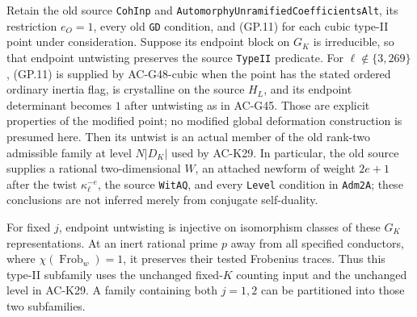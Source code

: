 \begin{corollary}
\label{AC-K29-typeII}
Retain the old source \texttt{CohInp} and
\texttt{AutomorphyUnramifiedCoefficientsAlt}, its restriction
$e_O=1$, every old \texttt{GD} condition, and (GP.11) for each
cubic type-II point under consideration.  Suppose its endpoint
block on $G_K$ is irreducible, so that endpoint untwisting
preserves the source \texttt{TypeII} predicate.
For $\ell\notin\{3,269\}$, (GP.11) is supplied by
AC-G48-cubic when the point has the stated ordered ordinary
inertia flag, is crystalline on the source $H_L$, and its
endpoint determinant becomes $1$ after untwisting as in
AC-G45.  Those are explicit properties of the modified point;
no modified global deformation construction is presumed here.
Then its untwist is an actual member of the old rank-two
admissible family at level $N|D_K|$ used by AC-K29.  In
particular, the old source supplies a rational two-dimensional
$W$, an attached newform of weight $2e+1$ after the twist
$\kappa_\ell^{-e}$, the source \texttt{WitAQ}, and every
\texttt{Level} condition in \texttt{Adm2A}; these conclusions
are not inferred merely from conjugate self-duality.

For fixed $j$, endpoint untwisting is injective on isomorphism
classes of these $G_K$ representations.  At an inert rational
prime $p$ away from all specified conductors, where
$\chi(\operatorname{Frob}_w)=1$, it preserves their tested
Frobenius traces.  Thus this type-II subfamily uses the
unchanged fixed-$K$ counting input and the unchanged level
in AC-K29.  A family containing both $j=1,2$ can be partitioned
into those two subfamilies.
\end{corollary}
